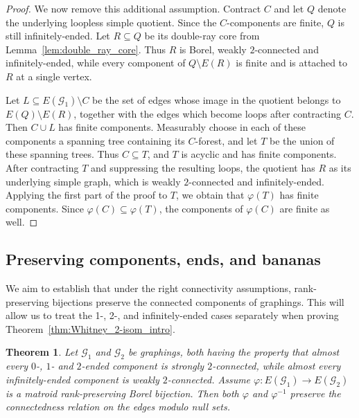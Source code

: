 \documentclass{article}
\theoremstyle{plain}
\newtheorem{thm}{Theorem}[section]
\theoremstyle{definition}
\newcommand{\cG}{\mathcal{G}}
\newcommand{\fg}{\varphi}
\begin{document}
\begin{proof}
We now remove this additional assumption. Contract $C$ and let $Q$ denote the underlying loopless simple quotient. Since the $C$-components are finite, $Q$ is still infinitely-ended. Let $R\subseteq Q$ be its double-ray core from Lemma~\ref{lem:double_ray_core}. Thus $R$ is Borel, weakly $2$-connected and infinitely-ended, while every component of $Q\setminus E(R)$ is finite and is attached to $R$ at a single vertex.

Let $L\subseteq E(\cG_1)\setminus C$ be the set of edges whose image in the quotient belongs to $E(Q)\setminus E(R)$, together with the edges which become loops after contracting $C$. Then $C\cup L$ has finite components. Measurably choose in each of these components a spanning tree containing its $C$-forest, and let $T$ be the union of these spanning trees. Thus $C\subseteq T$, and $T$ is acyclic and has finite components. After contracting $T$ and suppressing the resulting loops, the quotient has $R$ as its underlying simple graph, which is weakly $2$-connected and infinitely-ended. Applying the first part of the proof to $T$, we obtain that $\varphi(T)$ has finite components. Since $\varphi(C)\subseteq\varphi(T)$, the components of $\varphi(C)$ are finite as well.\end{proof}






\subsection{Preserving components, ends, and bananas} \label{subsec:preserving_comps_ends_bananas}


We aim to establish that under the right connectivity assumptions, rank-preserving bijections preserve the connected components of graphings. This will allow us to treat the 1-, 2-, and infinitely-ended cases separately when proving Theorem~\ref{thm:Whitney_2-isom_intro}.

\begin{thm}\label{thm:connected_preserving}
    Let $\cG_1$ and $\cG_2$ be graphings, both having the property that almost every $0$-, $1$- and $2$-ended component is strongly $2$-connected, while almost every infinitely-ended component is weakly $2$-connected. %
    Assume $\fg: E(\cG_1) \to E(\cG_2)$ is a matroid rank-preserving Borel bijection. Then both $\varphi$ and $\varphi^{-1}$ preserve the connectedness relation on the edges modulo null sets.
\end{thm}
\end{document}
